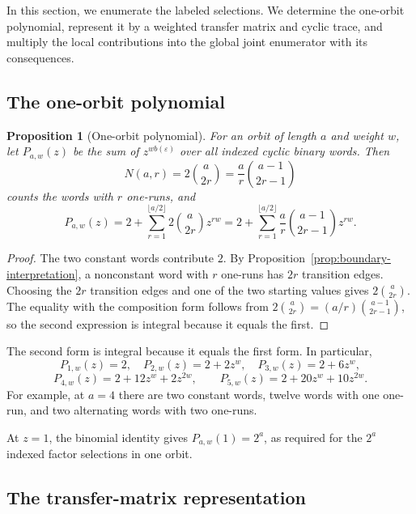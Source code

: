 \documentclass[11pt]{article}
\theoremstyle{plain}
\newtheorem{proposition}{Proposition}
\theoremstyle{definition}
\theoremstyle{remark}
\begin{document}
In this section, we enumerate the labeled selections. We determine the one-orbit polynomial, represent it by a weighted transfer matrix and cyclic trace, and multiply the local contributions into the global joint enumerator with its consequences.

\subsection{The one-orbit polynomial}\label{sec:orbit}

\begin{proposition}[One-orbit polynomial]\label{prop:orbit-poly}
For an orbit of length $a$ and weight $w$, let $P_{a,w}(z)$ be the sum of $z^{wb(\varepsilon)}$ over all indexed cyclic binary words. Then
\[
N(a,r)=2\binom{a}{2r}
 =\frac{a}{r}\binom{a-1}{2r-1}
\]
counts the words with $r$ one-runs, and
\begin{equation}\label{eq:orbit-poly}
P_{a,w}(z)=2+
 \sum_{r=1}^{\lfloor a/2\rfloor}
 2\binom{a}{2r}z^{rw}
 =2+
 \sum_{r=1}^{\lfloor a/2\rfloor}
 \frac{a}{r}\binom{a-1}{2r-1}z^{rw}.
\end{equation}
\end{proposition}

\begin{proof}
The two constant words contribute $2$. By Proposition~\ref{prop:boundary-interpretation}, a nonconstant word with $r$ one-runs has $2r$ transition edges. Choosing the $2r$ transition edges and one of the two starting values gives $2\binom{a}{2r}$. The equality with the composition form follows from
$2\binom{a}{2r}=(a/r)\binom{a-1}{2r-1}$, so the second expression is integral because it equals the first.
\end{proof}

The second form is integral because it equals the first form. In particular,
\[
P_{1,w}(z)=2,\quad
P_{2,w}(z)=2+2z^w,\quad
P_{3,w}(z)=2+6z^w,
\]
\[
P_{4,w}(z)=2+12z^w+2z^{2w},\qquad
P_{5,w}(z)=2+20z^w+10z^{2w}.
\]
For example, at $a=4$ there are two constant words, twelve words with one one-run, and two alternating words with two one-runs.

At $z=1$, the binomial identity gives $P_{a,w}(1)=2^a$, as required for the $2^a$ indexed factor selections in one orbit.

\subsection{The transfer-matrix representation}\label{sec:transfer}
\end{document}
